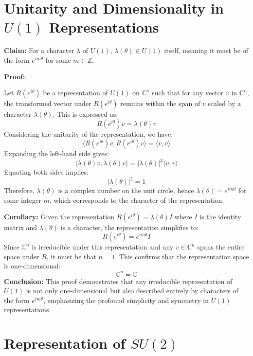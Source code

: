 \documentclass{article}
\begin{document}
\section*{Unitarity and Dimensionality in \(U(1)\) Representations}

\textbf{Claim:} For a character \(\lambda\) of \(U(1)\), \(\lambda(\theta) \in U(1)\) itself, meaning it must be of the form \(e^{im\theta}\) for some \(m \in \mathbb{Z}\).

\textbf{Proof:}

Let \( R(e^{i\theta}) \) be a representation of \( U(1) \) on \(\mathbb{C}^n\) such that for any vector \( v \) in \(\mathbb{C}^n\), the transformed vector under \( R(e^{i\theta}) \) remains within the span of \( v \) scaled by a character \(\lambda(\theta)\). This is expressed as:
\[
R(e^{i\theta}) v = \lambda(\theta) v
\]
Considering the unitarity of the representation, we have:
\[
\langle R(e^{i\theta}) v, R(e^{i\theta}) v \rangle = \langle v, v \rangle
\]
Expanding the left-hand side gives:
\[
\langle \lambda(\theta) v, \lambda(\theta) v \rangle = |\lambda(\theta)|^2 \langle v, v \rangle
\]
Equating both sides implies:
\[
|\lambda(\theta)|^2 = 1
\]
Therefore, \(\lambda(\theta)\) is a complex number on the unit circle, hence \(\lambda(\theta) = e^{im\theta}\) for some integer \(m\), which corresponds to the character of the representation.

\textbf{Corollary:}
Given the representation \( R(e^{i\theta}) = \lambda(\theta)I \) where \( I \) is the identity matrix and \( \lambda(\theta) \) is a character, the representation simplifies to:
\[
R(e^{i\theta}) = e^{im\theta}I
\]
Since \( \mathbb{C}^n \) is irreducible under this representation and any \( v \in \mathbb{C}^n \) spans the entire space under \( R \), it must be that \( n = 1 \). This confirms that the representation space is one-dimensional:
\[
\mathbb{C}^n = \mathbb{C}
\]
\textbf{Conclusion:}
This proof demonstrates that any irreducible representation of \(U(1)\) is not only one-dimensional but also described entirely by characters of the form \( e^{im\theta} \), emphasizing the profound simplicity and symmetry in \(U(1)\) representations.

\section{Representation of \( SU(2) \)}
\end{document}
